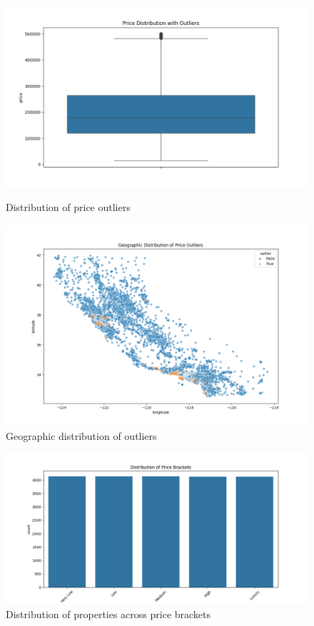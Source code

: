 \documentclass[a4paper, 11pt]{article}
\begin{document}
\begin{figure}[h]
    \centering
    \begin{minipage}{0.48\textwidth}
        \includegraphics[width=\linewidth]{figs/price_outliers.png}
        \caption{Distribution of price outliers}
        \label{fig:outliers_box}
    \end{minipage}
    \hfill
    \begin{minipage}{0.48\textwidth}
        \includegraphics[width=\linewidth]{figs/outliers_geographic.png}
        \caption{Geographic distribution of outliers}
        \label{fig:outliers_map}
    \end{minipage}
\end{figure}

\begin{figure}[h]
    \centering
    \includegraphics[width=0.8\linewidth]{figs/price_brackets.png}
    \caption{Distribution of properties across price brackets}
    \label{fig:price_brackets}
\end{figure}
\end{document}
